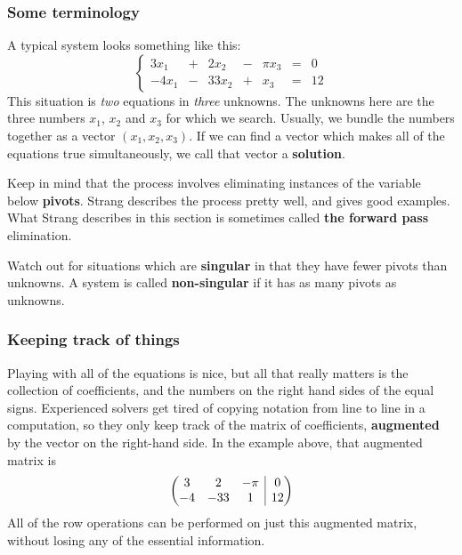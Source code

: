 \documentclass[10pt,]{book}
\makeatletter
\newcommand{\terminology}[1]{\textbf{#1}}
\theoremstyle{plain}
\numberwithin{equation}{section}
\newcommand{\augmatrix}[2]{\left(\begin{array}{@{}#1 |c@{}} #2 \end{array}\right)}
\makeatother
\begin{document}
\subsubsection[Some terminology]{Some terminology}\label{subsubsection-11}
A typical system looks something like this:
          \[
            \left\{ \begin{array}{rrrrrrrr}
                  3 x_1 & +&  2 x_2 & - & \pi x_3 & = & 0 \\
                  -4 x_1 & -& 33 x_2 & + & x_3 & = & 12
                  \end{array}\right.
          \]
          This situation is \emph{two} equations in \emph{three} unknowns.
          The unknowns here are the three numbers \(x_1\), \(x_2\) and
          \(x_3\) for which we search. Usually, we bundle the numbers
          together as a vector \((x_1, x_2, x_3)\). If we can find a vector
          which makes all of the equations true simultaneously, we call that
          vector a \terminology{solution}.
\par

          Keep in mind that the process involves eliminating instances of the
          variable below \terminology{pivots}. Strang describes the process
          pretty well, and gives good examples. What Strang describes in this
          section is sometimes called \terminology{the forward pass} elimination.
\par

          Watch out for situations which are \terminology{singular} in that they
          have fewer pivots than unknowns. A system is called
          \terminology{non-singular} if it has as many pivots as unknowns.
\typeout{************************************************}
\typeout{************************************************}
\subsubsection[Keeping track of things]{Keeping track of things}\label{subsubsection-12}

          Playing with all of the equations is nice, but all that really
          matters is the collection of coefficients, and the numbers on the
          right hand sides of the equal signs. Experienced solvers get tired
          of copying notation from line to line in a computation, so they only
          keep track of the matrix of coefficients, \terminology{augmented} by
          the vector on the right-hand side. In the example above, that
          augmented matrix is
          \[
            \augmatrix{ccc}{
            3 & 2 & -\pi & 0 \\ -4 & -33 & 1 & 12
            }
          \]
          All of the row operations can be performed on just this augmented
          matrix, without losing any of the essential information.
\typeout{************************************************}
\typeout{************************************************}
\end{document}
